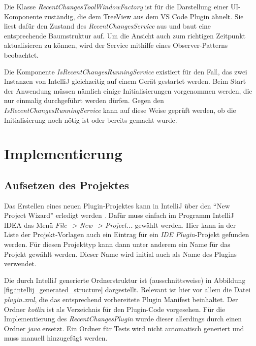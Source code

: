 Die Klasse \emph{RecentChangesToolWindowFactory} ist für die Darstellung
einer \linebreak
UI-Komponente zuständig, die dem TreeView aus dem VS Code Plugin
ähnelt. Sie liest dafür den Zustand des \emph{RecentChangesService} aus
und baut eine entsprechende Baumstruktur auf. Um die Ansicht auch zum richtigen
Zeitpunkt aktualisieren zu können, wird der Service mithilfe eines
Observer-Patterns \cite{2005Dp:e} beobachtet.

Die Komponente \emph{IsRecentChangesRunningService} existiert für den Fall,
das zwei Instanzen von IntelliJ gleichzeitig auf einem Gerät gestartet werden.
Beim Start der Anwendung müssen nämlich einige Initialisierungen vorgenommen
werden, die nur einmalig durchgeführt werden dürfen. Gegen den
\emph{IsRecentChangesRunningService} kann auf diese Weise geprüft werden, ob
die Initialisierung noch nötig ist oder bereits gemacht wurde.


\section{Implementierung}
\label{sec:EntwicklungIntelliJ_Implementierung}

\subsection{Aufsetzen des Projektes}

Das Erstellen eines neuen Plugin-Projektes kann in IntelliJ über den 
\enquote{New Project Wizard} erledigt werden
\cite{IntelliJPlatformSDKCreateProject}. Dafür muss einfach
im Programm IntelliJ IDEA das Menü \emph{File -> New -> Project...}
gewählt werden. Hier kann in der Liste der Projekt-Vorlagen
auch ein Eintrag für ein \emph{IDE Plugin}-Projekt gefunden werden.
Für diesen Projekttyp kann dann unter anderem
ein Name für das Projekt gewählt werden. Dieser Name wird initial auch als
Name des Plugins verwendet.

Die durch IntelliJ generierte Ordnerstruktur ist (ausschnittsweise) in 
Abbildung \ref{fig:intellij_generated_structure} dargestellt.
Relevant ist hier vor allem die Datei \emph{plugin.xml}, die das 
ent\-sprechend vorbereitete Plugin Manifest beinhaltet. Der Ordner
\emph{kotlin} ist als Verzeichnis für den Plugin-Code vorgesehen.
Für die Implementierung des \emph{RecentChangesPlugin} wurde dieser
allerdings durch einen Ordner \emph{java} ersetzt.
Ein Ordner für Tests wird nicht automatisch generiert
und muss manuell hinzugefügt werden.

